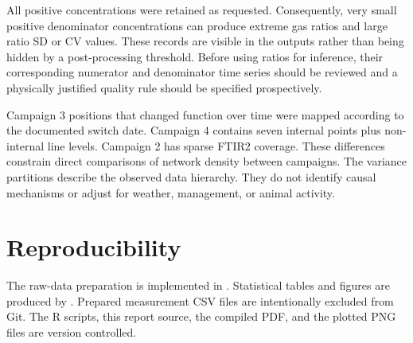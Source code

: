 \documentclass[11pt,a4paper]{article}
\begin{document}
All positive concentrations were retained as requested. Consequently, very small positive denominator concentrations can produce extreme gas ratios and large ratio SD or CV values. These records are visible in the outputs rather than being hidden by a post-processing threshold. Before using ratios for inference, their corresponding numerator and denominator time series should be reviewed and a physically justified quality rule should be specified prospectively.

Campaign 3 positions that changed function over time were mapped according to the documented switch date. Campaign 4 contains seven internal points plus non-internal line levels. Campaign 2 has sparse FTIR2 coverage. These differences constrain direct comparisons of network density between campaigns. The variance partitions describe the observed data hierarchy. They do not identify causal mechanisms or adjust for weather, management, or animal activity.

\section{Reproducibility}

{\raggedright
The raw-data preparation is implemented in
.
Statistical tables and figures are produced by
.
Prepared measurement CSV files are intentionally excluded from Git. The R scripts, this report source, the compiled PDF, and the plotted PNG files are version controlled.\par}
\end{document}
